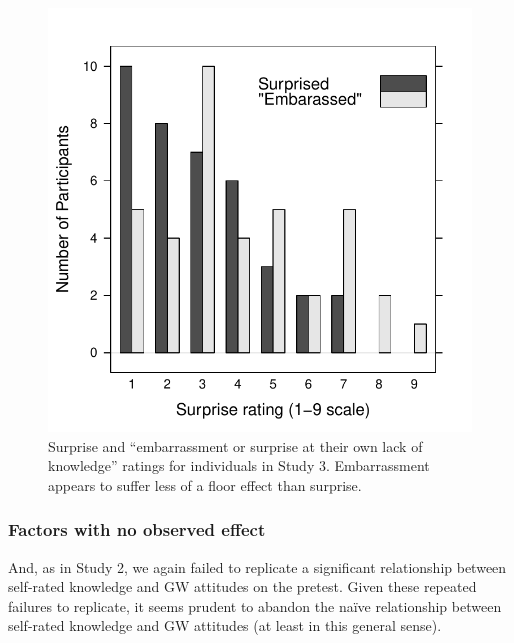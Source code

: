\begin{figure}
    \centering
    \includegraphics{CCO-mech-surprise-by-question.pdf}
    \caption{Surprise and “embarrassment or surprise at their own lack of
        knowledge” ratings for individuals in Study 3.  Embarrassment appears to
        suffer less of a floor effect than surprise.}
    \label{fig:CCO-mech-surprise}
\end{figure}


\subsubsection{Factors with no observed effect}

And, as in
Study 2, we again failed to replicate a significant relationship between
self-rated knowledge and GW attitudes on the pretest. Given these repeated
failures to replicate, it seems prudent to abandon the naïve relationship
between self-rated knowledge and GW attitudes (at least in this general sense).


